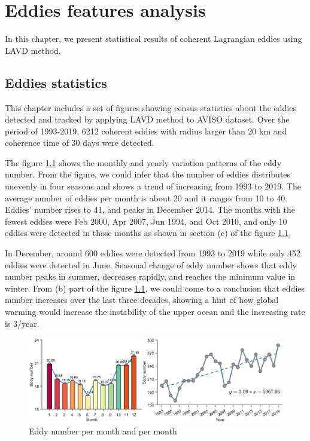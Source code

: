 \chapter{Eddies features analysis} \label{Eddies features analysis}

In this chapter, we present statistical results of coherent Lagrangian eddies using LAVD method.



\section{Eddies statistics}\label{Eddies statistics}

This chapter includes a set of figures showing census statistics about the eddies detected and tracked by applying LAVD method to AVISO dataset. Over the period of 1993-2019, 6212 coherent eddies with radius larger than 20 km and coherence time of 30 days were detected.

The figure \ref{fig:eddy number} shows the monthly and yearly variation patterns of the eddy number. From the figure, we could infer that the number of eddies distributes unevenly in four seasons and shows a trend of increasing from 1993 to 2019. The average number of eddies per month is about 20 and it ranges from 10 to 40. Eddies' number rises to 41, and peaks in December 2014. The months with the fewest eddies were Feb 2000, Apr 2007, Jun 1994, and Oct 2010, and only 10 eddies were detected in those months as shown in section (c) of the figure \ref{fig:eddy number}.  

In December, around 600 eddies were detected from 1993 to 2019 while only 452 eddies were detected in June. Seasonal change of eddy number shows that eddy number peaks in summer, decreases rapidly, and reaches the minimum value in winter. From (b) part of the figure \ref{fig:eddy number}, we could come to a conclusion that eddies number increases over the last three decades, showing a hint of how global warming would increase the instability of the upper ocean and the increasing rate is 3/year.

\begin{figure}
    \centering
    \includegraphics[width = 15cm]{chapter/figure/Eddy number per month and per month.png}
    \caption{Eddy number per month and per month}
    \label{fig:eddy number}
\end{figure}

